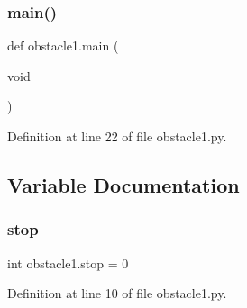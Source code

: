 \subsubsection{\texorpdfstring{main()}{main()}}
{\footnotesize\ttfamily def obstacle1.\+main (\begin{DoxyParamCaption}\item[{void}]{ }\end{DoxyParamCaption})}



Definition at line 22 of file obstacle1.\+py.



\subsection{Variable Documentation}
\mbox{\label{namespaceobstacle1_a9e60f290d90669907366c4e7bd4e9449}} 
\subsubsection{\texorpdfstring{stop}{stop}}
{\footnotesize\ttfamily int obstacle1.\+stop = 0}



Definition at line 10 of file obstacle1.\+py.

